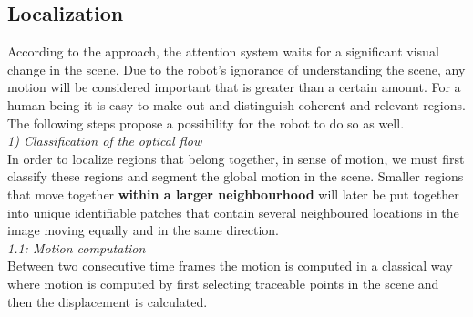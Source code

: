 \documentclass[conference]{IEEEtran}
\begin{document}
\subsection{Localization}\label{method:localization}
According to the approach, the attention system waits for a significant visual change in the scene. Due to the robot's ignorance of understanding the scene, any motion will be considered important that is greater than a certain amount. For a human being it is easy to make out and distinguish coherent and relevant regions. The following steps propose a possibility for the robot to do so as well.\\ \newline
%
%
\textit{1) Classification of the optical flow}\\ \newline
In order to localize regions that belong together, in sense of motion, we must first classify these regions and segment the global motion in the scene. Smaller regions that move together \textbf{within a larger neighbourhood } will later be put together into unique identifiable patches that contain several neighboured locations in the image moving equally and in the same direction.\\ \newline
%
\textit{1.1: Motion computation}\\ \newline
Between two consecutive time frames the motion is computed in a classical way where motion is computed by first selecting traceable points in the scene and then the displacement is calculated.
\end{document}
